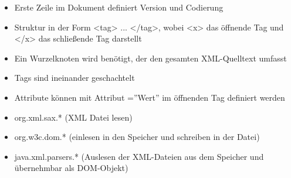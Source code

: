 \nsecend
{}
\begin{itemize}
	\item Erste Zeile im Dokument definiert Version und Codierung
\item Struktur in der Form <tag> ... </tag>, wobei <x> das öffnende Tag und </x> das schließende Tag darstellt
\item Ein Wurzelknoten wird benötigt, der den gesamten XML-Quelltext umfasst
\item Tags sind ineinander geschachtelt
\item Attribute können mit Attribut =''Wert'' im öffnenden Tag definiert werden		
\end{itemize}
\nsecend
{}
\begin{itemize}
\item org.xml.sax.* (XML Datei lesen)
\item org.w3c.dom.* (einlesen in den Speicher und schreiben in der Datei)
\item java.xml.parsers.* (Auslesen der XML-Dateien aus dem Speicher und übernehmbar als DOM-Objekt)
\end{itemize}
\nsecend
\nsecend